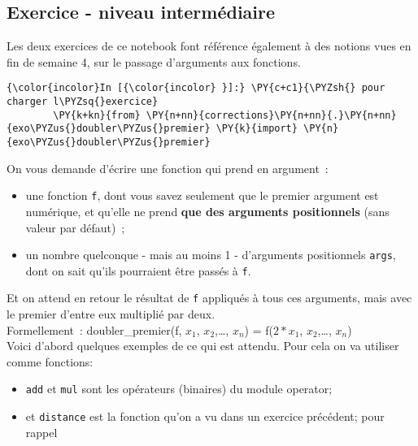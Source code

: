     \hypertarget{exercice---niveau-intermuxe9diaire}{%
\subsection{Exercice - niveau
intermédiaire}\label{exercice---niveau-intermuxe9diaire}}

    Les deux exercices de ce notebook font référence également à des notions
vues en fin de semaine 4, sur le passage d'arguments aux fonctions.

    \begin{Verbatim}[commandchars=\\\{\}]
{\color{incolor}In [{\color{incolor} }]:} \PY{c+c1}{\PYZsh{} pour charger l\PYZsq{}exercice}
        \PY{k+kn}{from} \PY{n+nn}{corrections}\PY{n+nn}{.}\PY{n+nn}{exo\PYZus{}doubler\PYZus{}premier} \PY{k}{import} \PY{n}{exo\PYZus{}doubler\PYZus{}premier}
\end{Verbatim}


    On vous demande d'écrire une fonction qui prend en argument~:
    
\begin{itemize}
	\item 
	une fonction \texttt{f}, dont vous savez seulement que le premier argument
	est numérique, et qu'elle ne prend \textbf{que des arguments
	positionnels} (sans valeur par défaut)~;
	\item
	un nombre quelconque - mais
	au moins 1 - d'arguments positionnels \texttt{args}, dont on sait qu'ils
	pourraient être passés à \texttt{f}.
\end{itemize}

Et on attend en retour le résultat de \texttt{f} appliqués à tous ces
arguments, mais avec le premier d'entre eux multiplié par deux.\\

Formellement~: doubler\_premier(f, \(x_1\), \(x_2\),\ldots{}, \(x_n\)) =
f(\(2*x_1\), \(x_2\),\ldots{}, \(x_n\))\\

    Voici d'abord quelques exemples de ce qui est attendu. Pour cela on va
utiliser comme fonctions:

\begin{itemize}
\tightlist
\item
  \texttt{add} et \texttt{mul} sont les opérateurs (binaires) du module
  operator;
\item
  et \texttt{distance} est la fonction qu'on a vu dans un exercice
  précédent; pour rappel
\end{itemize}

